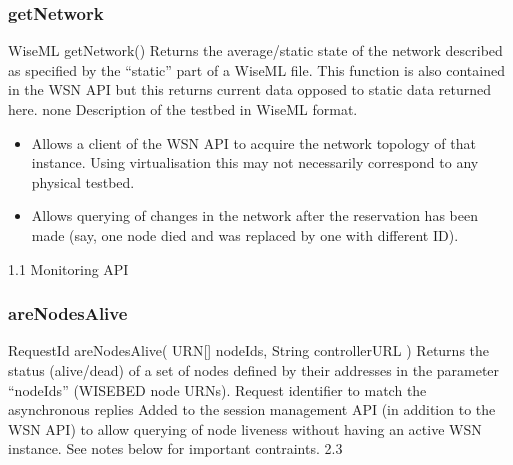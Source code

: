 			\subsubsection{getNetwork}

\begin{apidoc}
	{WiseML getNetwork()} %
	{Returns the average/static state of the network described as specified by the ``static'' part of a WiseML file. This function is also contained in the WSN API but this returns current data opposed to static data returned here.} %
	{none} %
	{Description of the testbed in WiseML format. } %
	{\begin{itemize}
			\item Allows a client of the WSN API to acquire the network topology of that instance. Using virtualisation this may not necessarily correspond to any physical testbed.
			\item Allows querying of changes in the network after the reservation has been made (say, one node died and was replaced by one with different ID).
		\end{itemize}
	} %
	{1.1 Monitoring API} %
\end{apidoc}

			\subsubsection{areNodesAlive}

\begin{apidoc}
	{RequestId areNodesAlive( URN[] nodeIds, String controllerURL )} %
	{Returns the status (alive/dead) of a set of nodes defined by their addresses in the parameter ``nodeIds'' (WISEBED node URNs).  	
	} %
	{
	} %
	{Request identifier to match the asynchronous replies} %
	{ Added to the session management API (in addition to the WSN API) to allow querying of node liveness without having an active WSN instance. See notes below for important contraints.} %
	{2.3
	} %
\end{apidoc}

